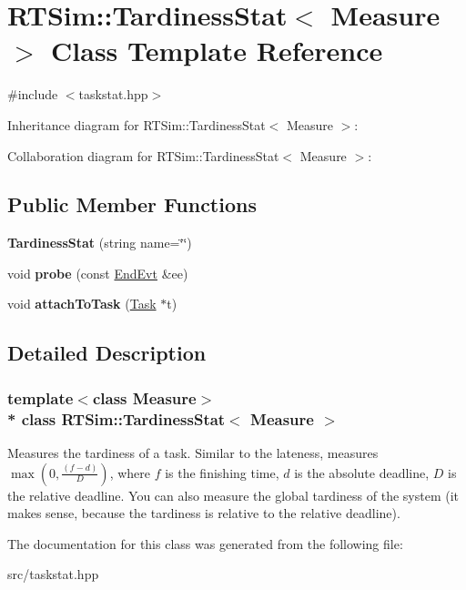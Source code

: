\hypertarget{classRTSim_1_1TardinessStat}{}\section{R\+T\+Sim\+:\+:Tardiness\+Stat$<$ Measure $>$ Class Template Reference}
\label{classRTSim_1_1TardinessStat}


{\ttfamily \#include $<$taskstat.\+hpp$>$}



Inheritance diagram for R\+T\+Sim\+:\+:Tardiness\+Stat$<$ Measure $>$\+:


Collaboration diagram for R\+T\+Sim\+:\+:Tardiness\+Stat$<$ Measure $>$\+:
\subsection*{Public Member Functions}
\begin{DoxyCompactItemize}
\item 
{\bfseries Tardiness\+Stat} (string name=\char`\"{}\char`\"{})\hypertarget{classRTSim_1_1TardinessStat_a9e8bc6ca12aaf1f546dd9da6f482b62d}{}\label{classRTSim_1_1TardinessStat_a9e8bc6ca12aaf1f546dd9da6f482b62d}

\item 
void {\bfseries probe} (const \hyperlink{classRTSim_1_1EndEvt}{End\+Evt} \&ee)\hypertarget{classRTSim_1_1TardinessStat_a64e22117fac4e43ecb6d321e72746e17}{}\label{classRTSim_1_1TardinessStat_a64e22117fac4e43ecb6d321e72746e17}

\item 
void {\bfseries attach\+To\+Task} (\hyperlink{classRTSim_1_1Task}{Task} $\ast$t)\hypertarget{classRTSim_1_1TardinessStat_ad855b378a1eb85bdaaa590a5e8c82d71}{}\label{classRTSim_1_1TardinessStat_ad855b378a1eb85bdaaa590a5e8c82d71}

\end{DoxyCompactItemize}


\subsection{Detailed Description}
\subsubsection*{template$<$class Measure$>$\\*
class R\+T\+Sim\+::\+Tardiness\+Stat$<$ Measure $>$}

Measures the tardiness of a task. Similar to the lateness, measures $\max(0, \frac{(f-d)}{D})$, where $ f $ is the finishing time, $ d $ is the absolute deadline, $ D $ is the relative deadline. You can also measure the global tardiness of the system (it makes sense, because the tardiness is relative to the relative deadline). 

The documentation for this class was generated from the following file\+:\begin{DoxyCompactItemize}
\item 
src/taskstat.\+hpp\end{DoxyCompactItemize}
